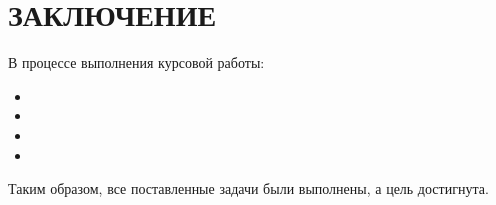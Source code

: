 \chapter*{ЗАКЛЮЧЕНИЕ}
В процессе выполнения курсовой работы:
\begin{itemize}
    \item
    \item
    \item
    \item
\end{itemize}

Таким образом, все поставленные задачи были выполнены, а цель достигнута.
